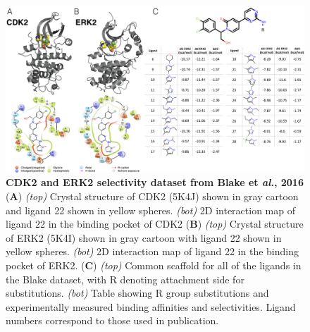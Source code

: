 \documentclass[phd,tocprelim]{cornell}
\begin{document}
\begin{landscape}
\begin{figure}[p]
\centering
\includegraphics[width=1.0\linewidth]{figures/figure3.png}
\caption[CDK2 and ERK2 selectivity dataset from Blake et \emph{al}., 2016]{
{\bf CDK2 and ERK2 selectivity dataset from Blake et \emph{al}., 2016} \\
({\bf A})  \emph{(top)} Crystal structure of CDK2 (5K4J) shown in gray cartoon and ligand 22 shown in yellow spheres. \emph{(bot)} 2D interaction map of ligand 22 in the binding pocket of CDK2
({\bf B}) \emph{(top)} Crystal structure of ERK2 (5K4I) shown in gray cartoon with ligand 22 shown in yellow spheres. \emph{(bot)} 2D interaction map of ligand 22 in the binding pocket of ERK2.
({\bf C}) \emph{(top)} Common scaffold for all of the ligands in the Blake dataset, with R denoting attachment side for substitutions. \emph{(bot)} Table showing R group substitutions and experimentally measured binding affinities and selectivities. Ligand numbers correspond to those used in publication. 
}
\label{fig:figure-3}
\end{figure}
\end{landscape}
\end{document}
